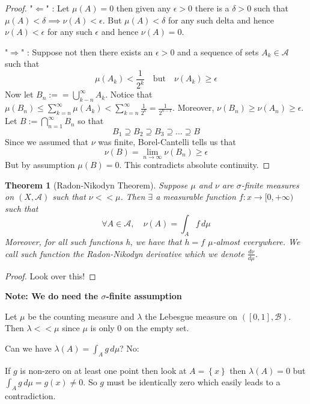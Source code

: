 \documentclass[11pt]{article}
\newcommand{\defeq}{:=}
\newcommand{\dm}{\ensuremath{\,d\mu}}
\newcommand{\mdf}[1]{{\color{red} #1}}
\newenvironment{note}
	{\begin{mdframed}[backgroundcolor=white, linecolor=red, roundcorner=5pt, linewidth=1pt]\bfseries{Note:}\normalfont}
	{\end{mdframed}}
\newtheorem{theorem}{Theorem}[section]
\begin{document}
\begin{proof}
"$\Longleftarrow$" : Let $\mu(A) = 0$ then given any $\epsilon > 0 $ there is a $\delta>0$ such that $\mu(A) < \delta \implies \nu(A) < \epsilon$.
But $\mu(A) < \delta$ for any such delta and hence $\nu(A)<\epsilon$ for any such $\epsilon$ and hence $\nu(A)=0$.

"$\Longrightarrow$" : Suppose not then there exists an $\epsilon >0$ and a sequence of sets $A_k\in\mathcal{A}$ such that
\[
	\mu(A_k) < \frac{1}{2^k} \quad \text{but} \quad \nu(A_k) \geq \epsilon
\]
Now let $B_n\defeq=\bigcup_{k-n}^\infty A_k$.
Notice that $\mu(B_n) \leq\sum_{k=n}^{\infty}\mu(A_k) < \sum_{k=n}^{\infty}\frac{1}{2^k} = \frac{1}{2^{n-1}}$.
Moreover, $\nu(B_n) \geq \nu(A_n) \geq \epsilon$.
Let $B\defeq \bigcap_{n=1}^\infty B_n$ so that
\[
B_1 \supseteq B_2 \supseteq B_3 \supseteq \dots \supseteq B
\]
Since we assumed that $\nu$ was finite, Borel-Cantelli tells us that
\[
	\nu(B)=\lim_{n\to\infty}\nu(B_n)\geq \epsilon
\]
But by assumption $\mu(B) = 0$.
This contradicts absolute continuity.
\end{proof}

\begin{theorem}[Radon-Nikodyn Theorem]
Suppose $\mu$ and $\nu$ are $\sigma$-finite measures on $(X, \mathcal{A})$ such that $\nu << \mu$.
Then $\exists$ a measurable function $f: x \to [0, +\infty)$ such that
\[
	\forall A \in \mathcal{A}, \quad \nu(A)=\int_A f \dm
\]
Moreover, for all such functions h, we have that $h=f$ $\mu$-almost everywhere.
We call such function the \mdf{Radon-Nikodyn derivative} which we denote $\frac{d\nu}{d\mu}$.
\end{theorem}
\begin{proof}
Look over this!
\end{proof}
\begin{note}
	\textbf{We do need the $\sigma$-finite assumption}

	Let $\mu$ be the counting measure and $\lambda$ the Lebesgue measure on $([0,1], \mathcal{B})$.
	Then $\lambda << \mu$ since $\mu$ is only 0 on the empty set.

	Can we have $\lambda(A) = \int_A g \dm$?
	No:

	If $g$ is non-zero on at least one point then look at $A=\left\{x\right\}$ then $\lambda(A)=0$ but $\int_A g \dm = g(x)\neq 0$.
	So $g$ must be identically zero which easily leads to a contradiction.
\end{note}
\end{document}
